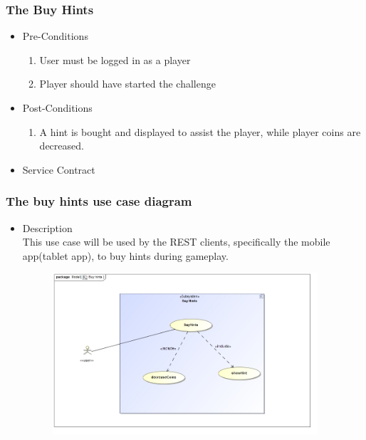 \documentclass[english]{article}
\begin{document}
		\subsubsection{The Buy Hints}
		
			\begin{itemize}
	
		
		\item Pre-Conditions
			\begin{enumerate}
				
				\item User must be logged in as a player
				\item Player should have started the challenge
			\end{enumerate}
		\item Post-Conditions
			\begin{enumerate}
			\item A hint is bought and displayed to assist the player, while player coins are decreased.
						
			\end{enumerate}
		\item Service Contract
			\begin{figure}
			
			\end{figure}

		\end{itemize}
		
		
		\subsubsection* {The buy hints use case diagram}
		\begin{itemize}
			\item Description\\
			This use case will be used by the REST clients, specifically the mobile app(tablet app), to buy hints 
			during gameplay.
		\end{itemize}
		
	
		\includegraphics[width=14cm,height=6cm,keepaspectratio]{BuyHints.jpg}	
		
\end{document}
